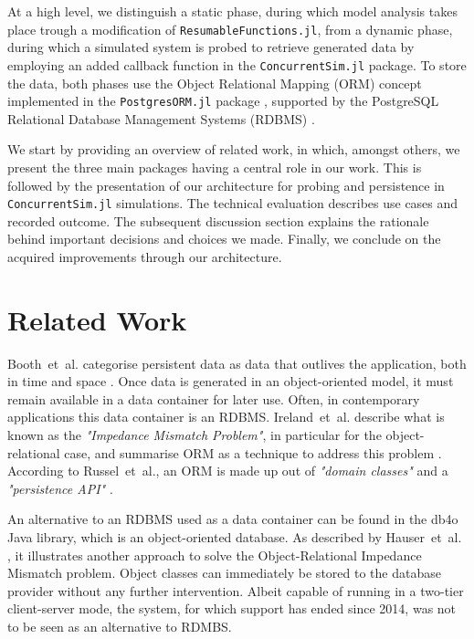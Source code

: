 \documentclass{juliacon}
\begin{document}
At a high level, we distinguish a static phase, during which model analysis takes place trough a modification of \texttt{ResumableFunctions.jl}, from a dynamic phase, during which a simulated system is probed to retrieve generated data by employing an added callback function in the \texttt{ConcurrentSim.jl}  package. To store the data, both phases use the Object Relational Mapping (ORM) concept \cite{russell2008bridging} implemented in the \texttt{PostgresORM.jl} package \cite{tecnivelPostgresORM}, supported by the PostgreSQL Relational Database Management Systems (RDBMS) \cite{psqldocs}. \vskip 6pt

We start by providing an overview of related work, in which, amongst others, we present the three main packages having a central role in our work. This is followed by the presentation of our architecture for probing and persistence in \texttt{ConcurrentSim.jl} simulations. The technical evaluation describes use cases and recorded outcome. The subsequent discussion section explains the rationale behind important decisions and choices we made. Finally, we conclude on the acquired improvements through our architecture. \vskip 6pt

\section{Related Work}\label{MainPackages}

Booth~et~al. categorise persistent data as data that outlives the application, both in time and space \cite{booch2008object}. Once data is generated in an object-oriented model, it must remain available in a data container for later use. Often, in contemporary applications this data container is an RDBMS. Ireland~et~al. describe what is known as the \textit{"Impedance Mismatch Problem"}, in particular for the object-relational case, and summarise ORM as a technique to address this problem \cite{ireland2009classification}. According to Russel~et~al., an ORM is made up out of \textit{"domain classes"} and a \textit{"persistence API"} \cite{russell2008bridging}.\vskip 6pt

An alternative to an RDBMS used as a data container can be found in the db4o Java library, which is an object-oriented database. As described by Hauser~et~al. \cite{hauser2011review}, it illustrates another approach to solve the Object-Relational Impedance Mismatch problem. Object classes can immediately be stored to the database provider without any further intervention. Albeit capable of running in a two-tier client-server mode, the system, for which support has ended since 2014, was not to be seen as an alternative to RDMBS.\vskip 6pt
\end{document}
